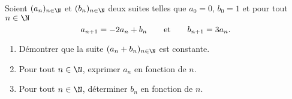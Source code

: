 
\begin{exercice} \;
Soient $(a_n)_{n\in\N}$ et $(b_n)_{n\in\N}$ deux suites telles que $a_0=0$, $b_0=1$ et pour tout $n\in\N$
$$a_{n+1}=-2a_n+b_n\qquad \hbox{et}\qquad b_{n+1}=3a_n.$$
\begin{enumerate}
\item D\'emontrer que la suite $(a_n+b_n)_{n\in\N}$ est constante.
\item Pour tout $n\in\N$, exprimer $a_n$ en fonction de $n$.
\item Pour tout $n\in\N$, d\'eterminer $b_n$ en fonction de $n$.
\end{enumerate}
\end{exercice}